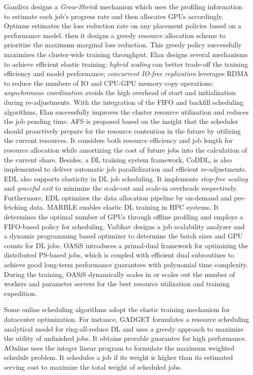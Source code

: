 Gandiva \cite{Gandiva} designs a \emph{Grow-Shrink} mechanism which uses the profiling information to estimate each job’s progress rate and then allocates GPUs accordingly. Optimus \cite{Optimus} estimates the loss reduction rate on any placement policies based on a performance model. then it designs a greedy resource allocation scheme to prioritize the maximum marginal loss reduction. This greedy policy successfully maximizes the cluster-wide training throughput. Elan \cite{ELAN} designs several mechanisms to achieve efficient elastic training: \emph{hybrid scaling} can better trade-off the training efficiency and model performance; \emph{concurrent IO-free replication} leverages RDMA to reduce the numbers of IO and CPU-GPU memory copy operations; \emph{asynchronous coordination} avoids the high overhead of start and initialization during re-adjustments. With the integration of the FIFO and backfill scheduling algorithms, Elan successfully improves the cluster resource utilization and reduces the job pending time. AFS \cite{AFS} is proposed based on the insight that the scheduler should proactively prepare for the resource contention in the future by utilizing the current resources. It considers both resource efficiency and job length for resource allocation while amortizing the cost of future jobs into the calculation of the current share. Besides, a DL training system framework, CoDDL, is also implemented to deliver automatic job parallelization and efficient re-adjustments. EDL \cite{EDL} also supports elasticity in DL job scheduling. It implements \emph{stop-free scaling} and \emph{graceful exit} to minimize the scale-out and scale-in overheads respectively. Furthermore, EDL optimizes the data allocation pipeline by on-demand and pre-fetching data. MARBLE \cite{Marble} enables elastic DL training in HPC systems. It determines the optimal number of GPUs through offline profiling and employs a FIFO-based policy for scheduling. Vaibhav \etal \cite{Effective20} designs a job scalability analyzer and a dynamic programming based optimizer to determine the batch sizes and GPU counts for DL jobs. OASiS \cite{OASiS} introduces a primal-dual framework for optimizing the distributed PS-based jobs, which is coupled with efficient dual subroutines to achieve good long-term performance guarantees with polynomial time complexity. During the training, OASiS dynamically scales in or scales out the number of workers and parameter servers for the best resource utilization and training expedition.

Some online scheduling algorithms adopt the elastic training mechanism for datacenter optimization. For instance, GADGET \cite{GADGET} formulates a resource scheduling analytical model for ring-all-reduce DL and uses a greedy approach to maximize the utility of unfinished jobs. It obtains provable guarantee for high performance. AOnline \cite{AOnline,AOnlineTPDS} uses the integer linear program to formulate the maximum weighted schedule problem. It schedules a job if its weight is higher than its estimated serving cost to maximize the total weight of scheduled jobs.

